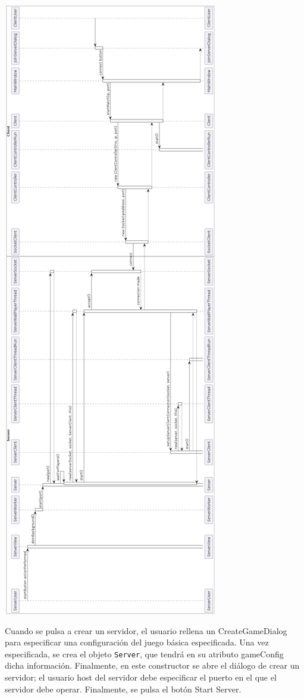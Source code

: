 \documentclass[12pt,a4paper,openright]{book}
\theoremstyle{break}
\begin{document}
\begin{center}
\includegraphics[scale=0.4]{umlconexionessprint7.png}
\end{center}

Cuando se pulsa a crear un servidor, el usuario rellena un CreateGameDialog para especificar una configuración del juego básica especificada. Una vez especificada, se crea el objeto \texttt{Server}, que tendrá en su atributo gameConfig dicha información. Finalmente, en este constructor se abre el diálogo de crear un servidor; el usuario host del servidor debe especificar el puerto en el que el servidor debe operar. Finalmente, se pulsa el botón Start Server.
\end{document}
